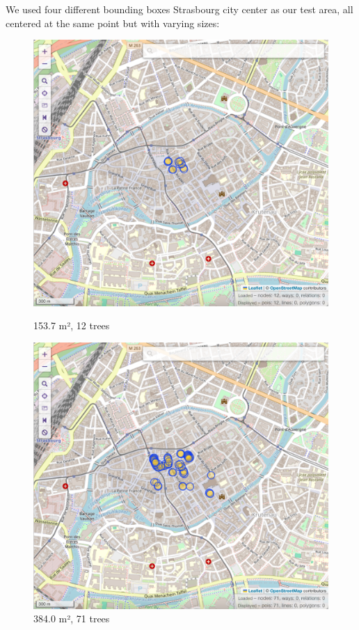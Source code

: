 \documentclass[12pt]{article}
\begin{document}
We used four different bounding boxes Strasbourg city center as our test area, 
all centered at the same point but with
varying sizes:

\begin{figure}[H]
    \centering
    \begin{minipage}{0.45\textwidth}
        \centering
        \includegraphics[width=\textwidth]{images/bbox1.png}
        \caption{153.7 m², 12 trees}
    \end{minipage}\hfill
    \begin{minipage}{0.45\textwidth}
        \centering
        \includegraphics[width=\textwidth]{images/bbox2.png}
        \caption{384.0 m², 71 trees}
    \end{minipage}
\end{figure}
\end{document}
